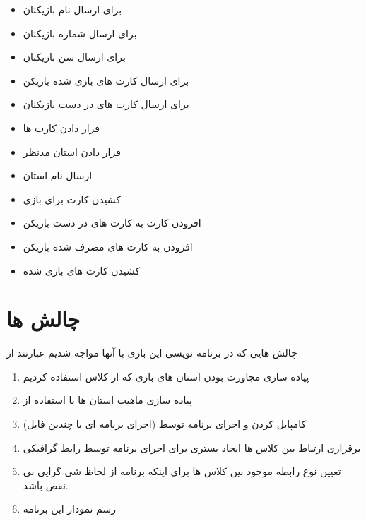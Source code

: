 \documentclass[pdf,titlepage,a4paper]{report}
\begin{document}
	\begin{itemize}
		\item {} برای ارسال نام بازیکنان
		\item {} برای ارسال شماره بازیکنان
		\item {}  برای ارسال سن بازیکنان
		\item {} برای ارسال کارت های بازی شده بازیکن
		\item {} برای ارسال کارت های در دست بازیکنان
		\item {} قرار دادن کارت ها
		\item {} قرار دادن استان مدنظر
		\item {} ارسال نام استان
		\item {} کشیدن کارت برای بازی 
		\item {} افزودن کارت به کارت های در دست بازیکن
		\item {} افزودن به کارت های مصرف شده بازیکن
		\item {} کشیدن کارت های بازی شده
	\end{itemize}
	
	\newpage
	
	
	
	\part{چالش ها}
	
	چالش هایی که در برنامه نویسی این بازی با آنها مواجه شدیم عبارتند از 
	\begin{enumerate}
		\item	پیاده سازی مجاورت بودن استان های بازی که از کلاس   استفاده کردیم 
		\item پیاده سازی ماهیت استان ها با استفاده از  
		\item کامپایل کردن و اجرای برنامه توسط  (اجرای برنامه ای با چندین فایل)
    	\item برقراری ارتباط بین کلاس ها  ایجاد بستری برای اجرای برنامه توسط رابط گرافیکی 
	    \item تعیین نوع رابطه موجود بین کلاس ها برای اینکه برنامه از لحاظ شی گرایی بی نقص باشد.
		\item رسم نمودار این برنامه
	\end{enumerate}

	\newpage
		
\end{document}
